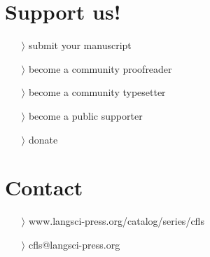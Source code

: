\documentclass[
notumble,
nofoldmark,
]{leaflet}
\begin{document}
{{    \section{\color{LIGHTGRAY} \sffamily \Large Support us!}
	\begin{itemize}
	  \item[$\rangle$] submit your manuscript 
	  \item[$\rangle$] become a community proofreader 
	  \item[$\rangle$] become a community typesetter
	  \item[$\rangle$] become a public supporter
	  \item[$\rangle$] donate
	\end{itemize} 
    \section{\color{LIGHTGRAY} \sffamily \Large Contact} 
	\begin{itemize}
	  \item[$\rangle$] \sffamily www.langsci-press.org/catalog/series/cfls
	  \item[$\rangle$]\sffamily  cfls@langsci-press.org 
	\end{itemize} 
  }
}

\usebox{\pageone}

\newpage

\usebox{\pagetwo}

\newpage

\usebox{\pagetwo}

\newpage

\usebox{\pagetwo}

\newpage

\usebox{\pageone}

\newpage

\usebox{\pageone}
 

\loggingall
\end{document}
